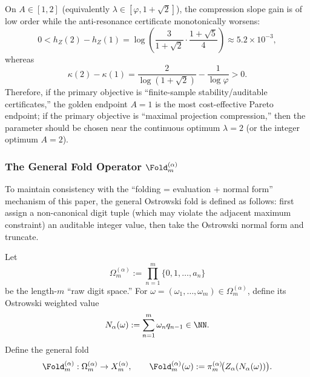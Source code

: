 \begin{remark}[Design Law: Golden \texorpdfstring{$A=1$}{A=1} $\to$ Silver \texorpdfstring{$A=2$}{A=2} Lies in the ``Low-Return, High-Cost'' Segment]\label{rem:metallic-design-law-low-return}
On \(A\in[1,2]\) (equivalently \(\lambda\in[\varphi,1+\sqrt2]\)), the compression slope gain is of low order while the anti-resonance certificate monotonically worsens:
\[
0<h_Z(2)-h_Z(1)
=\log\!\left(\frac{3}{1+\sqrt2}\cdot\frac{1+\sqrt5}{4}\right)\approx 5.2\times 10^{-3},
\]
whereas
\[
\kappa(2)-\kappa(1)=\frac{2}{\log(1+\sqrt2)}-\frac{1}{\log\varphi}>0.
\]
Therefore, if the primary objective is ``finite-sample stability/auditable certificates,'' the golden endpoint \(A=1\) is the most cost-effective Pareto endpoint;
if the primary objective is ``maximal projection compression,'' then the parameter should be chosen near the continuous optimum \(\lambda=2\) (or the integer optimum \(A=2\)).
\end{remark}

\subsubsection{The General Fold Operator \texorpdfstring{$\Fold_m^{(\alpha)}$}{Fold\_m(alpha)}}

To maintain consistency with the ``folding = evaluation + normal form'' mechanism of this paper, the general Ostrowski fold is defined as follows: first assign a non-canonical digit tuple (which may violate the adjacent maximum constraint) an auditable integer value, then take the Ostrowski normal form and truncate.

\begin{definition}\label{def:fold-alpha}
Let
\[
\Omega_m^{(\alpha)}:=\prod_{n=1}^{m}\{0,1,\dots,a_n\}
\]
be the length-$m$ ``raw digit space.'' For $\omega=(\omega_1,\dots,\omega_m)\in\Omega_m^{(\alpha)}$, define its Ostrowski weighted value
\[
N_\alpha(\omega):=\sum_{n=1}^{m}\omega_n q_{n-1}\in\NN.
\]
Define the general fold
\[
\Fold_m^{(\alpha)}:\Omega_m^{(\alpha)}\to X_m^{(\alpha)},\qquad
\Fold_m^{(\alpha)}(\omega):=\pi_m^{(\alpha)}\!\bigl(Z_\alpha(N_\alpha(\omega))\bigr).
\]
\end{definition}

